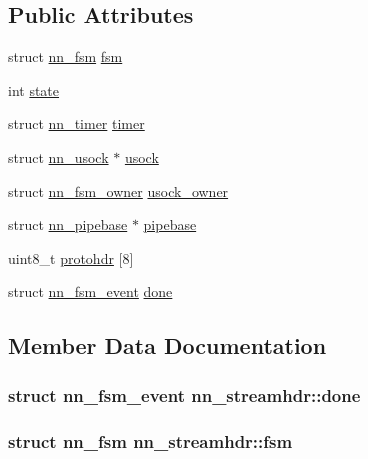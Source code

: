 \subsection*{Public Attributes}
\begin{DoxyCompactItemize}
\item 
struct \hyperlink{structnn__fsm}{nn\+\_\+fsm} \hyperlink{structnn__streamhdr_a79d1969412c9adf826156c1210d7b325}{fsm}
\item 
int \hyperlink{structnn__streamhdr_a720448235aaa27d08fbd8769664094cb}{state}
\item 
struct \hyperlink{structnn__timer}{nn\+\_\+timer} \hyperlink{structnn__streamhdr_abf10afb3e70039c31efeb4e3cae25733}{timer}
\item 
struct \hyperlink{structnn__usock}{nn\+\_\+usock} $\ast$ \hyperlink{structnn__streamhdr_aee06676379bc6c9dbef1fad5fc05fc0f}{usock}
\item 
struct \hyperlink{structnn__fsm__owner}{nn\+\_\+fsm\+\_\+owner} \hyperlink{structnn__streamhdr_a7ff476fc37646a9c472dbc44006849a3}{usock\+\_\+owner}
\item 
struct \hyperlink{structnn__pipebase}{nn\+\_\+pipebase} $\ast$ \hyperlink{structnn__streamhdr_ac35ee8048c2f4de86310e2fabb484b1d}{pipebase}
\item 
uint8\+\_\+t \hyperlink{structnn__streamhdr_ae98796384c88fcfaa6a6cb6810b22a2b}{protohdr} \mbox{[}8\mbox{]}
\item 
struct \hyperlink{structnn__fsm__event}{nn\+\_\+fsm\+\_\+event} \hyperlink{structnn__streamhdr_a743f23514b0ad9fb18bc545fd4a26c9c}{done}
\end{DoxyCompactItemize}


\subsection{Member Data Documentation}
\subsubsection[{done}]{\setlength{\rightskip}{0pt plus 5cm}struct {\bf nn\+\_\+fsm\+\_\+event} nn\+\_\+streamhdr\+::done}\hypertarget{structnn__streamhdr_a743f23514b0ad9fb18bc545fd4a26c9c}{}\label{structnn__streamhdr_a743f23514b0ad9fb18bc545fd4a26c9c}
\subsubsection[{fsm}]{\setlength{\rightskip}{0pt plus 5cm}struct {\bf nn\+\_\+fsm} nn\+\_\+streamhdr\+::fsm}\hypertarget{structnn__streamhdr_a79d1969412c9adf826156c1210d7b325}{}\label{structnn__streamhdr_a79d1969412c9adf826156c1210d7b325}
